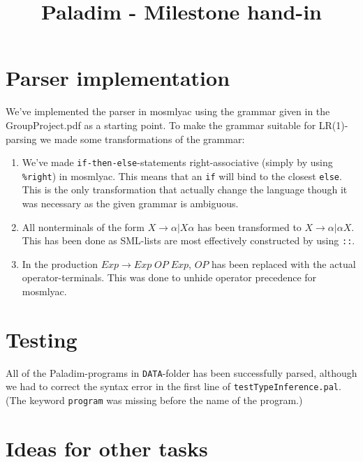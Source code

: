 \documentclass{article}
\title{Paladim - Milestone hand-in}
\author{}
\begin{document}
\maketitle
\newpage
\section{Parser implementation}
We've implemented the parser in mosmlyac using the grammar given in the GroupProject.pdf
as a starting point. To make the grammar suitable for LR(1)-parsing we made some
transformations of the grammar:
\begin{enumerate}
  \item We've made \texttt{if-then-else}-statements right-associative (simply by using
        \texttt{\%right}) in mosmlyac. This means that an \texttt{if} will bind to the
        closest \texttt{else}. This is the only transformation that actually change the
        language though it was necessary as the given grammar is ambiguous.
  \item All nonterminals of the form $X \rightarrow \alpha | X \alpha$ has been transformed
        to $X \rightarrow \alpha | \alpha X$. This has been done as SML-lists are most
        effectively constructed by using \texttt{::}.
  \item In the production $Exp \rightarrow Exp \; OP \; Exp$, $OP$ has been replaced with
        the actual operator-terminals. This was done to unhide operator precedence for
        mosmlyac.
\end{enumerate}
\section{Testing}
All of the Paladim-programs in \texttt{DATA}-folder has been successfully parsed, although 
we had to correct the syntax error in the first line of \texttt{testTypeInference.pal}.
(The keyword \texttt{program} was missing before the name of the program.)

\section{Ideas for other tasks}
\end{document}
